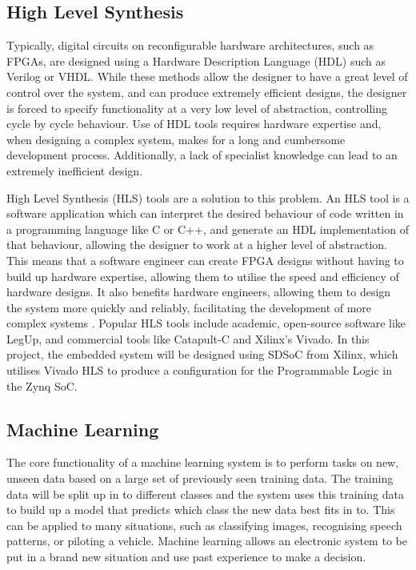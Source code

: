 \documentclass[12pt]{article}
\begin{document}
\subsection{High Level Synthesis}
\label{sec:Background-HLS}

Typically, digital circuits on reconfigurable hardware architectures, such as FPGAs, are designed using a Hardware Description Language (HDL) such as Verilog or VHDL. While these methods allow the designer to have a great level of control over the system, and can produce extremely efficient designs, the designer is forced to specify functionality at a very low level of abstraction, controlling cycle by cycle behaviour. Use of HDL tools requires hardware expertise and, when designing a complex system, makes for a long and cumbersome development process. Additionally, a lack of specialist knowledge can lead to an extremely inefficient design.

High Level Synthesis (HLS) tools are a  solution to this problem. An HLS tool is a software application which can interpret the desired behaviour of code written in a programming language like C or C++, and generate an HDL implementation of that behaviour, allowing the designer to work at a higher level of abstraction. This means that a software engineer can create FPGA designs without having to build up hardware expertise, allowing them to utilise the speed and efficiency of hardware designs. It also benefits hardware engineers, allowing them to design the system more quickly and reliably, facilitating the development of more complex systems \cite{HLS}. Popular HLS tools include academic, open-source software like LegUp, and commercial tools like Catapult-C and Xilinx's Vivado. In this project, the embedded system will be designed using SDSoC from Xilinx, which utilises Vivado HLS to produce a configuration for the Programmable Logic in the Zynq SoC.

\subsection{Machine Learning}
\label{sec:Background-ML}

The core functionality of a machine learning system is to perform tasks on new, unseen data based on a large set of previously seen training data. The training data will be split up in to different classes and the system uses this training data to build up a model that predicts which class the new data best fits in to. This can be applied to many situations, such as classifying images, recognising speech patterns, or piloting a vehicle. Machine learning allows an electronic system to be put in a brand new situation and use past experience to make a decision.
\end{document}

